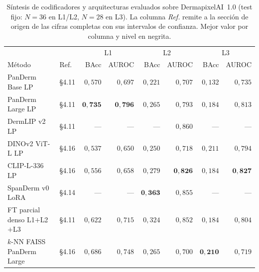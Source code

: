 \begin{table}[H]
\centering
\footnotesize
\setlength{\tabcolsep}{4pt}
\renewcommand{\arraystretch}{0.95}
\caption{Síntesis de codificadores y arquitecturas evaluados sobre
DermapixelAI~1.0 (test fijo: $N = 36$ en L1/L2, $N = 28$ en L3).
La columna \emph{Ref.} remite a la sección de origen de las cifras
completas con sus intervalos de confianza. Mejor valor por columna
y nivel en negrita.}
\label{tab:dermapixel-extra-sintesis}
\begin{tabular}{llrrrrrr}
\hline
                                  &     & \multicolumn{2}{c}{L1} & \multicolumn{2}{c}{L2} & \multicolumn{2}{c}{L3} \\
Método                            & Ref.& BAcc & AUROC           & BAcc & AUROC           & BAcc & AUROC \\
\hline
PanDerm Base LP                   & §4.11 & $0{,}570$          & $0{,}697$
                                          & $0{,}221$          & $0{,}707$
                                          & $0{,}132$          & $0{,}735$ \\
PanDerm Large LP                  & §4.11 & $\mathbf{0{,}735}$ & $\mathbf{0{,}796}$
                                          & $0{,}265$          & $0{,}793$
                                          & $0{,}184$          & $0{,}813$ \\
DermLIP v2 LP                     & §4.11 & ---                & ---
                                          & ---                & $0{,}860$
                                          & ---                & --- \\
DINOv2 ViT-L LP                   & §4.16 & $0{,}537$          & $0{,}650$
                                          & $0{,}250$          & $0{,}718$
                                          & $0{,}211$          & $0{,}794$ \\
CLIP-L-336 LP                     & §4.16 & $0{,}556$          & $0{,}658$
                                          & $0{,}279$          & $\mathbf{0{,}826}$
                                          & $0{,}184$          & $\mathbf{0{,}827}$ \\
SpanDerm v0 LoRA                  & §4.14 & ---                & ---
                                          & $\mathbf{0{,}363}$ & $0{,}855$
                                          & ---                & --- \\
FT parcial denso L1$+$L2$+$L3      & §4.11 & $0{,}622$          & $0{,}715$
                                          & $0{,}324$          & $0{,}852$
                                          & $0{,}184$          & $0{,}804$ \\
$k$-NN FAISS PanDerm Large         & §4.16 & $0{,}686$          & $0{,}748$
                                          & $0{,}265$          & $0{,}700$
                                          & $\mathbf{0{,}210}$ & $0{,}719$ \\
\hline
\end{tabular}
\end{table}

